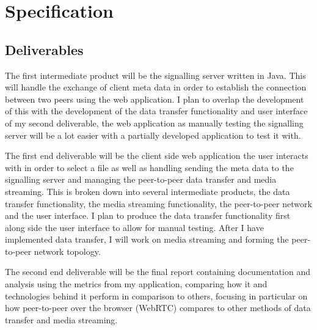 \documentclass[]{report}
\begin{document}
\chapter{Specification}
	\section{Deliverables}
	The first intermediate product will be the signalling server written in Java. This will handle the exchange of client meta data in order to establish the connection between two peers using the web application. I plan to overlap the development of this with the development of the data transfer functionality and user interface of my second deliverable, the web application as manually testing the signalling server will be a lot easier with a partially developed application to test it with.
	
	The first end deliverable will be the client side web application the user interacts with in order to select a file as well as handling sending the meta data to the signalling server and managing the peer-to-peer data transfer and media streaming. This is broken down into several intermediate products, the data transfer functionality, the media streaming functionality, the peer-to-peer network and the user interface. I plan to produce the data transfer functionality first along side the user interface to allow for manual testing. After I have implemented data transfer, I will work on media streaming and forming the peer-to-peer network topology. 
	
	The second end deliverable will be the final report containing documentation and analysis using the metrics from my application, comparing how it and technologies behind it perform in comparison to others, focusing in particular on how peer-to-peer over the browser (WebRTC) compares to other methods of data transfer and media streaming.
	
\end{document}
